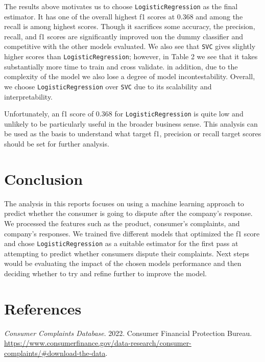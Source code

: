 \documentclass[
  letterpaper,
  DIV=11,
  numbers=noendperiod]{scrartcl}
\newlength{\cslhangindent}
\newlength{\cslentryspacingunit} %
\newenvironment{CSLReferences}[2] %
 {%
  \setlength{\parindent}{0pt}
  \ifodd #1
  \let\oldpar\par
  \def\par{\hangindent=\cslhangindent\oldpar}
  \fi
  \setlength{\parskip}{#2\cslentryspacingunit}
 }%
 {}
\begin{document}
The results above motivates us to choose \texttt{LogisticRegression} as
the final estimator. It has one of the overall highest f1 scores at
0.368 and among the recall is among highest scores. Though it sacrifices
some accuracy, the precision, recall, and f1 scores are significantly
improved uon the dummy classifier and competitive with the other models
evaluated. We also see that \texttt{SVC} gives slightly higher scores
than \texttt{LogisticRegression}; however, in Table 2 we see that it
takes substantially more time to train and cross validate. in addition,
due to the complexity of the model we also lose a degree of model
incontestability. Overall, we choose \texttt{LogisticRegression} over
\texttt{SVC} due to its scalability and interpretability.

Unfortunately, an f1 score of 0.368 for \texttt{LogisticRegression} is
quite low and unlikely to be particularly useful in the broader business
sense. This analysis can be used as the basis to understand what target
f1, precision or recall target scores should be set for further
analysis.

\hypertarget{conclusion}{%
\section{Conclusion}\label{conclusion}}

The analysis in this reports focuses on using a machine learning
approach to predict whether the consumer is going to dispute after the
company's response. We processed the features such as the product,
consumer's complaints, and company's responses. We trained five
different models that optimized the f1 score and chose
\texttt{LogisticRegression} as a suitable estimator for the first pass
at attempting to predict whether consumers dispute their complaints.
Next steps would be evaluating the impact of the chosen models
performance and then deciding whether to try and refine further to
improve the model.

\hypertarget{references}{%
\section*{References}\label{references}}

\hypertarget{refs}{}
\begin{CSLReferences}{1}{0}
\leavevmode{}%
\emph{Consumer Complaints Database}. 2022. Consumer Financial Protection
Bureau.
\url{https://www.consumerfinance.gov/data-research/consumer-complaints/\#download-the-data}.

\end{CSLReferences}
\end{document}
